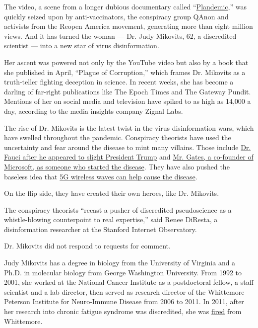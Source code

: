 The video, a scene from a longer dubious documentary called
``\href{https://www.nytimes3xbfgragh.onion/2020/05/20/technology/plandemic-movie-youtube-facebook-coronavirus.html}{Plandemic},''
was quickly seized upon by anti-vaccinators, the conspiracy group QAnon
and activists from the Reopen America movement, generating more than
eight million views. And it has turned the woman --- Dr. Judy Mikovits,
62, a discredited scientist --- into a new star of virus disinformation.

Her ascent was powered not only by the YouTube video but also by a book
that she published in April, ``Plague of Corruption,'' which frames Dr.
Mikovits as a truth-teller fighting deception in science. In recent
weeks, she has become a darling of far-right publications like The Epoch
Times and The Gateway Pundit. Mentions of her on social media and
television have spiked to as high as 14,000 a day, according to the
media insights company Zignal Labs.

The rise of Dr. Mikovits is the latest twist in the virus disinformation
wars, which have swelled throughout the pandemic. Conspiracy theorists
have used the uncertainty and fear around the disease to mint many
villains. Those include
\href{https://www.nytimes3xbfgragh.onion/2020/03/28/technology/coronavirus-fauci-trump-conspiracy-target.html}{Dr.
Fauci after he appeared to slight President Trump} and
\href{https://www.nytimes3xbfgragh.onion/2020/04/17/technology/bill-gates-virus-conspiracy-theories.html}{Mr.
Gates, a co-founder of Microsoft, as someone who started the disease}.
They have also pushed the baseless idea that
\href{https://www.nytimes3xbfgragh.onion/2020/04/10/technology/coronavirus-5g-uk.html}{5G
wireless waves can help cause the disease}.

On the flip side, they have created their own heroes, like Dr. Mikovits.

The conspiracy theorists ``recast a pusher of discredited pseudoscience
as a whistle-blowing counterpoint to real expertise,'' said Renee
DiResta, a disinformation researcher at the Stanford Internet
Observatory.

Dr. Mikovits did not respond to requests for comment.

Judy Mikovits has a degree in biology from the University of Virginia
and a Ph.D. in molecular biology from George Washington University. From
1992 to 2001, she worked at the National Cancer Institute as a
postdoctoral fellow, a staff scientist and a lab director, then served
as research director of the Whittemore Peterson Institute for
Neuro-Immune Disease from 2006 to 2011. In 2011, after her research into
chronic fatigue syndrome was discredited, she was
\href{https://www.sciencemag.org/news/2011/10/chronic-fatigue-syndrome-researcher-fired-amidst-new-controversy}{fired}
from Whittemore.

